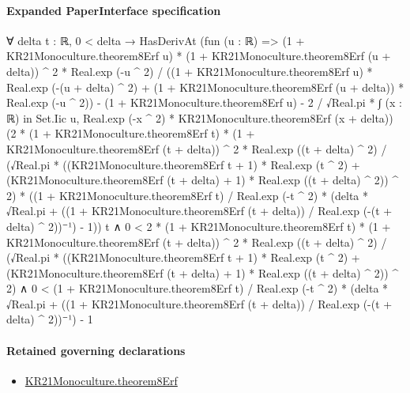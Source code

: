 \documentclass[10pt]{article}
\begin{document}
\paragraph{Expanded PaperInterface specification}
\begin{ReviewVerbatim}
∀ {delta t : ℝ},
  0 < delta →
    HasDerivAt
        (fun (u : ℝ) =>
          (1 + KR21Monoculture.theorem8Erf u) * (1 + KR21Monoculture.theorem8Erf (u + delta)) ^ 2 * Real.exp (-u ^ 2) /
                ((1 + KR21Monoculture.theorem8Erf u) * Real.exp (-(u + delta) ^ 2) +
                  (1 + KR21Monoculture.theorem8Erf (u + delta)) * Real.exp (-u ^ 2)) -
              (1 + KR21Monoculture.theorem8Erf u) -
            2 / √Real.pi * ∫ (x : ℝ) in Set.Iic u, Real.exp (-x ^ 2) * KR21Monoculture.theorem8Erf (x + delta))
        (2 * (1 + KR21Monoculture.theorem8Erf t) * (1 + KR21Monoculture.theorem8Erf (t + delta)) ^ 2 *
              Real.exp ((t + delta) ^ 2) /
            (√Real.pi *
              ((KR21Monoculture.theorem8Erf t + 1) * Real.exp (t ^ 2) +
                  (KR21Monoculture.theorem8Erf (t + delta) + 1) * Real.exp ((t + delta) ^ 2)) ^
                2) *
          ((1 + KR21Monoculture.theorem8Erf t) / Real.exp (-t ^ 2) *
              (delta * √Real.pi + ((1 + KR21Monoculture.theorem8Erf (t + delta)) / Real.exp (-(t + delta) ^ 2))⁻¹) -
            1))
        t ∧
      0 <
          2 * (1 + KR21Monoculture.theorem8Erf t) * (1 + KR21Monoculture.theorem8Erf (t + delta)) ^ 2 *
              Real.exp ((t + delta) ^ 2) /
            (√Real.pi *
              ((KR21Monoculture.theorem8Erf t + 1) * Real.exp (t ^ 2) +
                  (KR21Monoculture.theorem8Erf (t + delta) + 1) * Real.exp ((t + delta) ^ 2)) ^
                2) ∧
        0 <
          (1 + KR21Monoculture.theorem8Erf t) / Real.exp (-t ^ 2) *
              (delta * √Real.pi + ((1 + KR21Monoculture.theorem8Erf (t + delta)) / Real.exp (-(t + delta) ^ 2))⁻¹) -
            1
\end{ReviewVerbatim}

\paragraph{Retained governing declarations}
\begin{itemize}\raggedright
\item \hyperlink{paper-prerequisite-89a4972e4c2bbebd}{KR21\allowbreak{}Monoculture.\allowbreak{}theorem8\allowbreak{}Erf}
\end{itemize}
\end{document}
